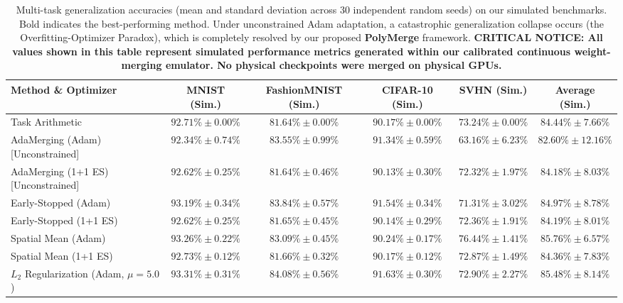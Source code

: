 \begin{table}[t]
\caption{Multi-task generalization accuracies (mean and standard deviation across 30 independent random seeds) on our simulated benchmarks. Bold indicates the best-performing method. Under unconstrained Adam adaptation, a catastrophic generalization collapse occurs (the Overfitting-Optimizer Paradox), which is completely resolved by our proposed \textbf{PolyMerge} framework. \textbf{CRITICAL NOTICE: All values shown in this table represent simulated performance metrics generated within our calibrated continuous weight-merging emulator. No physical checkpoints were merged on physical GPUs.}}
\label{tab:main_results}
\vskip 0.15in
\begin{center}
\begin{footnotesize}
\begin{sc}
\setlength{\tabcolsep}{3.5pt}
\begin{tabular}{lccccc}
\toprule
Method \& Optimizer & MNIST (Sim.) & FashionMNIST (Sim.) & CIFAR-10 (Sim.) & SVHN (Sim.) & \textbf{Average (Sim.)} \\
\midrule
Task Arithmetic & $92.71\% \pm 0.00\%$ & $81.64\% \pm 0.00\%$ & $90.17\% \pm 0.00\%$ & $73.24\% \pm 0.00\%$ & $84.44\% \pm 7.66\%$ \\
\midrule
AdaMerging (Adam) [Unconstrained] & $92.34\% \pm 0.74\%$ & $83.55\% \pm 0.99\%$ & $91.34\% \pm 0.59\%$ & $63.16\% \pm 6.23\%$ & $82.60\% \pm 12.16\%$ \\
AdaMerging (1+1 ES) [Unconstrained] & $92.62\% \pm 0.25\%$ & $81.64\% \pm 0.46\%$ & $90.13\% \pm 0.30\%$ & $72.32\% \pm 1.97\%$ & $84.18\% \pm 8.03\%$ \\
\midrule
Early-Stopped (Adam) & $93.19\% \pm 0.34\%$ & $83.84\% \pm 0.57\%$ & $91.54\% \pm 0.34\%$ & $71.31\% \pm 3.02\%$ & $84.97\% \pm 8.78\%$ \\
Early-Stopped (1+1 ES) & $92.62\% \pm 0.25\%$ & $81.65\% \pm 0.45\%$ & $90.14\% \pm 0.29\%$ & $72.36\% \pm 1.91\%$ & $84.19\% \pm 8.01\%$ \\
\midrule
Spatial Mean (Adam) & $93.26\% \pm 0.22\%$ & $83.09\% \pm 0.45\%$ & $90.24\% \pm 0.17\%$ & $76.44\% \pm 1.41\%$ & $85.76\% \pm 6.57\%$ \\
Spatial Mean (1+1 ES) & $92.73\% \pm 0.12\%$ & $81.66\% \pm 0.32\%$ & $90.17\% \pm 0.12\%$ & $72.87\% \pm 1.49\%$ & $84.36\% \pm 7.83\%$ \\
\midrule
$L_2$ Regularization (Adam, $\mu=5.0$) & $93.31\% \pm 0.31\%$ & $84.08\% \pm 0.56\%$ & $91.63\% \pm 0.30\%$ & $72.90\% \pm 2.27\%$ & $85.48\% \pm 8.14\%$ \\

\end{tabular}
\end{sc}
\end{footnotesize}
\end{center}
\end{table}
